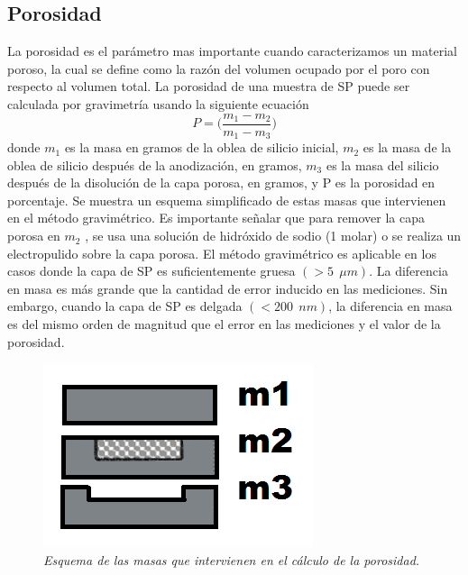 \documentclass[a4paper,11pt,]{book}
\begin{document}
\subsection{Porosidad}
La porosidad es el parámetro mas importante cuando caracterizamos un material poroso, la cual se define como la razón del volumen ocupado por el poro con respecto al volumen total. La porosidad de una muestra de SP puede ser calculada por gravimetría usando la siguiente ecuación 
\begin{equation}
P= \bigg(  \frac{m_1-m_2}{m_1 -m_3} \bigg) 
\end{equation}
donde $m_1$ es la masa en gramos de la oblea de silicio inicial, $m_2$ es la masa de la oblea de silicio después de la anodización, en gramos, $m_3$ es la masa del silicio después de la disolución de la capa porosa, en gramos, y P es la porosidad en porcentaje. Se muestra un esquema simplificado de estas masas que intervienen en el método gravimétrico. Es importante señalar que para remover la capa porosa
en $m_2$ , se usa una solución de hidróxido de sodio (1 molar) o se realiza un electropulido sobre la capa porosa. El método gravimétrico es aplicable
en los casos donde la capa de SP es suficientemente gruesa $(> 5 \ \ \mu m)$. La diferencia en masa es más grande que la cantidad de error inducido en las mediciones. Sin embargo, cuando la capa de SP es delgada $(< 200 \ \ nm)$, la diferencia en masa es del
mismo orden de magnitud que el error en las mediciones y el valor de la porosidad.
\begin{figure}[H]
	\centering
	\includegraphics[scale=.5]{../Images/poros}
	\caption{\emph{Esquema de las masas que intervienen en el cálculo de la porosidad.}}
	\label{fig:CP15}
\end{figure}
\end{document}
